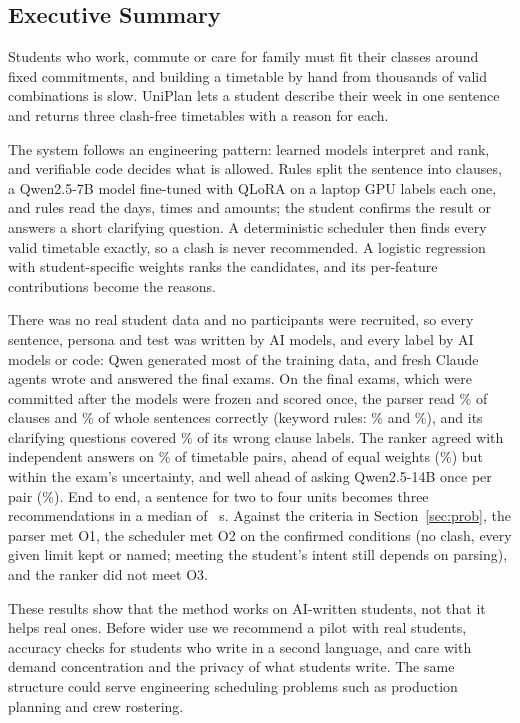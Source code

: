 \begin{center}
	\subsection*{Executive Summary}
\end{center}

\noindent Students who work, commute or care for family must fit their classes around fixed commitments, and building a timetable by hand from thousands of valid combinations is slow. UniPlan lets a student describe their week in one sentence and returns three clash-free timetables with a reason for each.

The system follows an engineering pattern: learned models interpret and rank, and verifiable code decides what is allowed. Rules split the sentence into clauses, a Qwen2.5-7B model fine-tuned with QLoRA on a laptop GPU labels each one, and rules read the days, times and amounts; the student confirms the result or answers a short clarifying question. A deterministic scheduler then finds every valid timetable exactly, so a clash is never recommended. A logistic regression with student-specific weights ranks the candidates, and its per-feature contributions become the reasons.

There was no real student data and no participants were recruited, so every sentence, persona and test was written by AI models, and every label by AI models or code: Qwen generated most of the training data, and fresh Claude agents wrote and answered the final exams. On the final exams, which were committed after the models were frozen and scored once, the parser read \pRtwoC\% of clauses and \pRtwoS\% of whole sentences correctly (keyword rules: \pKeyC\% and \pKeyS\%), and its clarifying questions covered \cCoveredPct\% of its wrong clause labels. The ranker agreed with independent answers on \rLR\% of timetable pairs, ahead of equal weights (\rEq\%) but within the exam's uncertainty, and well ahead of asking Qwen2.5-14B once per pair (\rQwen\%). End to end, a sentence for two to four units becomes three recommendations in a median of \plMedianRec{}~s. Against the criteria in Section~\ref{sec:prob}, the parser met O1, the scheduler met O2 on the confirmed conditions (no clash, every given limit kept or named; meeting the student's intent still depends on parsing), and the ranker did not meet O3.

These results show that the method works on AI-written students, not that it helps real ones. Before wider use we recommend a pilot with real students, accuracy checks for students who write in a second language, and care with demand concentration and the privacy of what students write. The same structure could serve engineering scheduling problems such as production planning and crew rostering.
